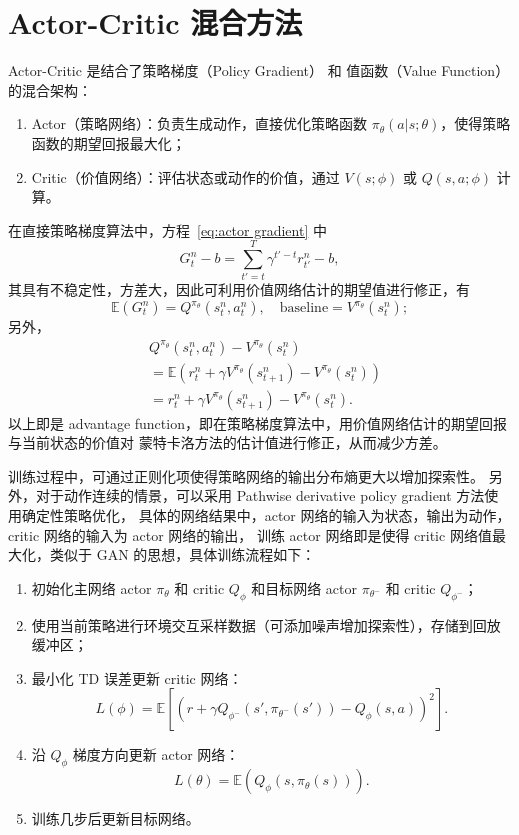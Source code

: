 \section{Actor-Critic 混合方法}
Actor-Critic 是结合了策略梯度（Policy Gradient） 和 值函数（Value Function） 的混合架构：
\begin{enumerate}
    \item Actor（策略网络）：负责生成动作，直接优化策略函数 $\pi_{\theta}(a|s;\theta)$，使得策略函数的期望回报最大化；
    \item Critic（价值网络）：评估状态或动作的价值，通过 $V(s;\phi)$ 或 $Q(s,a;\phi)$ 计算。
\end{enumerate}

在直接策略梯度算法中，方程~\ref{eq:actor gradient} 中
\begin{equation}
    G_t^n - b = \sum_{t'=t}^{T}\gamma^{t'-t}r_{t'}^n-b,
\end{equation}
其具有不稳定性，方差大，因此可利用价值网络估计的期望值进行修正，有
\begin{equation}
    \mathbb{E}(G_t^n) = Q^{\pi_{\theta}}(s_t^n,a_t^n),\quad \text{baseline} = V^{\pi_{\theta}}(s_t^n);
\end{equation}
另外，
\begin{align}
    &Q^{\pi_{\theta}}(s_t^n,a_t^n) - V^{\pi_{\theta}}(s_t^n) \\
    &=\mathbb{E}(r_t^n + \gamma V^{\pi_{\theta}}(s_{t+1}^n) - V^{\pi_{\theta}}(s_t^n))\\
    &= r_t^n + \gamma V^{\pi_{\theta}}(s_{t+1}^n) - V^{\pi_{\theta}}(s_t^n).
\end{align}
以上即是 advantage function，即在策略梯度算法中，用价值网络估计的期望回报与当前状态的价值对
蒙特卡洛方法的估计值进行修正，从而减少方差。

训练过程中，可通过正则化项使得策略网络的输出分布熵更大以增加探索性。
另外，对于动作连续的情景，可以采用 Pathwise derivative policy gradient 方法使用确定性策略优化，
具体的网络结果中，actor 网络的输入为状态，输出为动作，critic 网络的输入为 actor 网络的输出，
训练 actor 网络即是使得 critic 网络值最大化，类似于 GAN 的思想，具体训练流程如下：
\begin{enumerate}
    \item 初始化主网络 actor $\pi_{\theta}$ 和 critic $Q_{\phi}$ 和目标网络 actor $\pi_{\theta^-}$ 和 critic $Q_{\phi^-}$；
    \item 使用当前策略进行环境交互采样数据（可添加噪声增加探索性），存储到回放缓冲区；
    \item 最小化 TD 误差更新 critic 网络：
        \begin{equation}
            L(\phi) = \mathbb{E}\left[(r+\gamma Q_{\phi^-}(s',\pi_{\theta^-}(s')) - Q_{\phi}(s,a))^2\right].
        \end{equation}
    \item 沿 $Q_{\phi}$ 梯度方向更新 actor 网络：
        \begin{equation}
            L(\theta) = \mathbb{E}(Q_{\phi}(s,\pi_{\theta}(s))).
        \end{equation}
    \item 训练几步后更新目标网络。
\end{enumerate}